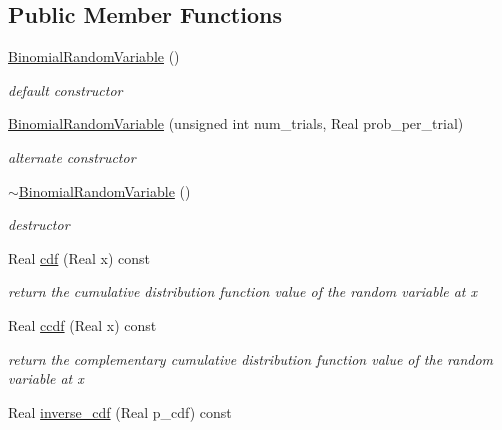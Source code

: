 \subsection*{Public Member Functions}
\begin{DoxyCompactItemize}
\item 
\hyperlink{classPecos_1_1BinomialRandomVariable_a218da5f5afff8a7a223cdbd2263cf3bd}{Binomial\+Random\+Variable} ()\label{classPecos_1_1BinomialRandomVariable_a218da5f5afff8a7a223cdbd2263cf3bd}

\begin{DoxyCompactList}\small\item\em default constructor \end{DoxyCompactList}\item 
\hyperlink{classPecos_1_1BinomialRandomVariable_a4ec1ac0122a9d28492dc7763ca309db8}{Binomial\+Random\+Variable} (unsigned int num\+\_\+trials, Real prob\+\_\+per\+\_\+trial)\label{classPecos_1_1BinomialRandomVariable_a4ec1ac0122a9d28492dc7763ca309db8}

\begin{DoxyCompactList}\small\item\em alternate constructor \end{DoxyCompactList}\item 
\hyperlink{classPecos_1_1BinomialRandomVariable_aec4d48ee5c7eef39b1dfd29bb9a17968}{$\sim$\+Binomial\+Random\+Variable} ()\label{classPecos_1_1BinomialRandomVariable_aec4d48ee5c7eef39b1dfd29bb9a17968}

\begin{DoxyCompactList}\small\item\em destructor \end{DoxyCompactList}\item 
Real \hyperlink{classPecos_1_1BinomialRandomVariable_addd564e7f4f314e12d38df74d845f0d8}{cdf} (Real x) const \label{classPecos_1_1BinomialRandomVariable_addd564e7f4f314e12d38df74d845f0d8}

\begin{DoxyCompactList}\small\item\em return the cumulative distribution function value of the random variable at x \end{DoxyCompactList}\item 
Real \hyperlink{classPecos_1_1BinomialRandomVariable_a23c3b599e7e4788a9a5e9e93c3dbaf4d}{ccdf} (Real x) const \label{classPecos_1_1BinomialRandomVariable_a23c3b599e7e4788a9a5e9e93c3dbaf4d}

\begin{DoxyCompactList}\small\item\em return the complementary cumulative distribution function value of the random variable at x \end{DoxyCompactList}\item 
Real \hyperlink{classPecos_1_1BinomialRandomVariable_a918a1aac05ca349ea5313eebcba46c3e}{inverse\+\_\+cdf} (Real p\+\_\+cdf) const \label{classPecos_1_1BinomialRandomVariable_a918a1aac05ca349ea5313eebcba46c3e}


\end{DoxyCompactItemize}
